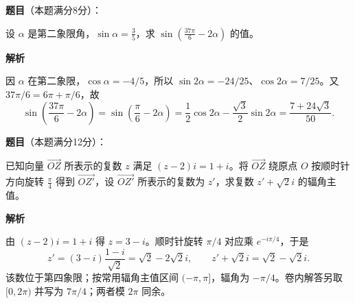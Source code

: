 \begin{answer}

\textbf{题目}（本题满分8分）：

设 $\alpha$ 是第二象限角，$\sin\alpha=\frac35$，求 $\sin\left(\frac{37\pi}{6}-2\alpha\right)$ 的值。

\textbf{解析}

因 $\alpha$ 在第二象限，$\cos\alpha=-4/5$，所以 $\sin2\alpha=-24/25$、$\cos2\alpha=7/25$。又 $37\pi/6=6\pi+\pi/6$，故
\nopagebreak[4]
\[
\sin\left(\frac{37\pi}{6}-2\alpha\right)=\sin\left(\frac\pi6-2\alpha\right)
=\frac12\cos2\alpha-\frac{\sqrt3}{2}\sin2\alpha
=\frac{7+24\sqrt3}{50}.
\]


\end{answer}
\begin{answer}

\textbf{题目}（本题满分12分）：

已知向量 $\overrightarrow{OZ}$ 所表示的复数 $z$ 满足 $(z-2)i=1+i$。将 $\overrightarrow{OZ}$ 绕原点 $O$ 按顺时针方向旋转 $\frac\pi4$ 得到 $\overrightarrow{OZ'}$，设 $\overrightarrow{OZ'}$ 所表示的复数为 $z'$，求复数 $z'+\sqrt2 i$ 的辐角主值。

\textbf{解析}

由 $(z-2)i=1+i$ 得 $z=3-i$。顺时针旋转 $\pi/4$ 对应乘 $e^{-i\pi/4}$，于是
\nopagebreak[4]
\[
z'=(3-i)\frac{1-i}{\sqrt2}=\sqrt2-2\sqrt2 i,
\qquad z'+\sqrt2 i=\sqrt2-\sqrt2 i.
\]
该数位于第四象限；按常用辐角主值区间 $(-\pi,\pi]$，辐角为 $-\pi/4$。卷内解答另取 $[0,2\pi)$ 并写为 $7\pi/4$；两者模 $2\pi$ 同余。


\end{answer}
